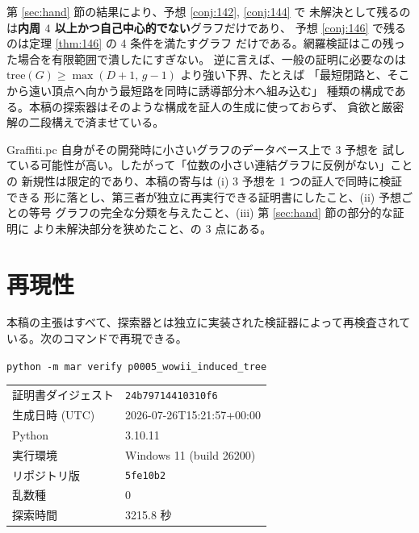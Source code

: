 \documentclass[paper=a4,fontsize=10.5pt,jafontsize=10.5pt]{jlreq}
\theoremstyle{plain}
\theoremstyle{definition}
\begin{document}
第 \ref{sec:hand} 節の結果により、予想 \ref{conj:142}, \ref{conj:144} で
未解決として残るのは\textbf{内周 $4$ 以上かつ自己中心的でない}グラフだけであり、
予想 \ref{conj:146} で残るのは定理 \ref{thm:146} の 4 条件を満たすグラフ
だけである。網羅検証はこの残った場合を有限範囲で潰したにすぎない。
逆に言えば、一般の証明に必要なのは
$\mathrm{tree}(G) \ge \max(D+1,\, g-1)$ より強い下界、たとえば
「最短閉路と、そこから遠い頂点へ向かう最短路を同時に誘導部分木へ組み込む」
種類の構成である。本稿の探索器はそのような構成を証人の生成に使っておらず、
貪欲と厳密解の二段構えで済ませている。

Graffiti.pc 自身がその開発時に小さいグラフのデータベース上で 3 予想を
試している可能性が高い。したがって「位数の小さい連結グラフに反例がない」ことの
新規性は限定的であり、本稿の寄与は (i) 3 予想を 1 つの証人で同時に検証できる
形に落とし、第三者が独立に再実行できる証明書にしたこと、(ii) 予想ごとの等号
グラフの完全な分類を与えたこと、(iii) 第 \ref{sec:hand} 節の部分的な証明に
より未解決部分を狭めたこと、の 3 点にある。


\section*{再現性}
本稿の主張はすべて、探索器とは独立に実装された検証器によって再検査されている。次のコマンドで再現できる。

\begin{center}\texttt{python -m mar verify p0005\_wowii\_induced\_tree}\end{center}

\begin{center}\begin{tabular}{ll}\toprule
証明書ダイジェスト & \texttt{24b79714410310f6} \\
生成日時 (UTC) & 2026-07-26T15:21:57+00:00 \\
Python & 3.10.11 \\
実行環境 & Windows 11 (build 26200) \\
リポジトリ版 & \texttt{5fe10b2} \\
乱数種 & 0 \\
探索時間 & 3215.8 秒 \\
\bottomrule\end{tabular}\end{center}
\end{document}
